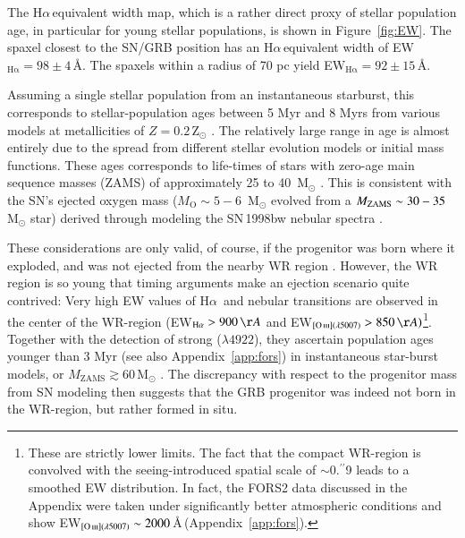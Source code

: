 \documentclass[traditabstract]{aa}
\newcommand{\farc}{\hbox{$.\!\!^{\prime\prime}$}}
\newcommand{\ha}{H$\alpha$}
\newcommand{\hei}{\ion{He}{i}}
\newcommand{\oiii}{[\ion{O}{iii}]}
\begin{document}
The \ha\,equivalent width map, which is a rather direct proxy of stellar population age, in particular for young stellar populations, is shown in Figure~\ref{fig:EW}. The spaxel closest to the SN/GRB position has an \ha\,equivalent width of EW$_{\mathrm{H\alpha}}=98\pm4$\,\AA. The spaxels within a radius of 70 pc yield EW$_{\mathrm{H\alpha}}=92\pm15$\,\AA. 

Assuming a single stellar population from an instantaneous starburst, this corresponds to stellar-population ages between 5 Myr and 8 Myrs from various models at metallicities of $Z=0.2$\,Z$_{\odot}$ \citep[see e.g.][and references therein]{2013ApJ...779..170L, 2016arXiv160703446K}. The relatively large range in age is almost entirely due to the spread from different stellar evolution models or initial mass functions. These ages corresponds to life-times of stars with zero-age main sequence masses (ZAMS) of approximately 25 to 40~M$_{\odot}$ \citep{1994A&AS..105...29F, 2005A&A...429..581M}. This is consistent with the SN's ejected oxygen mass ($M_{\mathrm{O}}\sim5-6$~M$_{\odot}$ evolved from a $M_{\rm{ZAMS}} \sim 30-35$\,M$_{\odot}$ star) derived through modeling the SN\,1998bw nebular spectra  \citep{2001ApJ...559.1047M, 2006ApJ...640..854M}.

These considerations are only valid, of course, if the progenitor was born where it exploded, and was not ejected from the nearby WR region \citep{2006A&A...454..103H}. However, the WR region is so young that timing arguments make an ejection scenario quite contrived: Very high EW values of \ha~and nebular transitions are observed in the center of the WR-region (EW$_{\mathrm{H\alpha}}>900\,\AA$ and EW$_{\oiii(\lambda5007)}>850\,\AA)$\footnote{These are strictly lower limits. The fact that the compact WR-region is convolved with the seeing-introduced spatial scale of $\sim$0\farc{9} leads to a smoothed EW distribution. In fact, the FORS2 data discussed in the Appendix were taken under significantly better atmospheric conditions and show EW$_{\oiii(\lambda5007)}\sim2000$\,\AA\,(Appendix~\ref{app:fors}).}. Together with the detection of strong \hei($\lambda4922$), they ascertain population ages younger than 3 Myr (see also Appendix~\ref{app:fors}) in instantaneous star-burst models, or $M_{\mathrm{ZAMS}} \gtrsim 60$\,M$_{\odot}$ \citep[see e.g.][and references therein for a similar case]{2015MNRAS.451L..65T}. The discrepancy with respect to the progenitor mass from SN modeling then suggests that the GRB progenitor was indeed not born in the WR-region, but rather formed in situ. 
\end{document}
